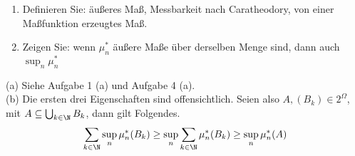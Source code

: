 
\begin{exercise}

\phantom{}

\begin{enumerate}[label = (\alph*)]

  \item
  Definieren Sie: äußeres Maß, Messbarkeit nach Caratheodory, von einer Maßfunktion erzeugtes Maß.
  
  \item
  Zeigen Sie: wenn $\mu^\ast_n$ äußere Maße über derselben Menge sind, dann auch $\sup_n \mu^\ast_n$

\end{enumerate}

\end{exercise}


\begin{solution}

(a) Siehe Aufgabe 1 (a) und Aufgabe 4 (a). \\

(b) Die ersten drei Eigenschaften sind offensichtlich. Seien also $A, (B_k) \in 2^\Omega$, mit $A \subseteq \bigcup_{k \in \N} B_k$, dann gilt Folgendes.
\begin{align*}
  \sum_{k \in \N} \sup_n \mu^\ast_n(B_k)
  \geq
  \sup_n \sum_{k \in \N} \mu^\ast_n(B_k)
  \geq
  \sup_n \mu^\ast_n(A)
\end{align*}

\end{solution}

